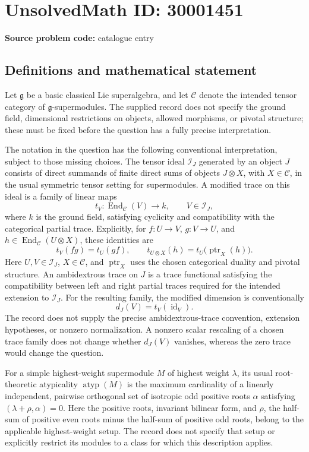 \documentclass[11pt]{article}
\begin{document}
\section*{UnsolvedMath ID: 30001451}
\textbf{Source problem code:} catalogue entry
\subsection{Definitions and mathematical statement}
Let \(\mathfrak g\) be a basic classical Lie superalgebra, and let \(\mathcal C\) denote the intended tensor category of \(\mathfrak g\)-supermodules. The supplied record does not specify the ground field, dimensional restrictions on objects, allowed morphisms, or pivotal structure; these must be fixed before the question has a fully precise interpretation.

The notation in the question has the following conventional interpretation, subject to those missing choices. The tensor ideal \(\mathcal I_J\) generated by an object \(J\) consists of direct summands of finite direct sums of objects \(J\otimes X\), with \(X\in\mathcal C\), in the usual symmetric tensor setting for supermodules. A modified trace on this ideal is a family of linear maps
\[
 t_V:\operatorname{End}_{\mathcal C}(V)\longrightarrow k,
 \qquad V\in\mathcal I_J,
\]
where \(k\) is the ground field, satisfying cyclicity and compatibility with the categorical partial trace. Explicitly, for \(f:U\to V\), \(g:V\to U\), and \(h\in\operatorname{End}_{\mathcal C}(U\otimes X)\), these identities are
\[
 t_V(fg)=t_U(gf),\qquad
 t_{U\otimes X}(h)=t_U\bigl(\operatorname{ptr}_X(h)\bigr).
\]
Here \(U,V\in\mathcal I_J\), \(X\in\mathcal C\), and \(\operatorname{ptr}_X\) uses the chosen categorical duality and pivotal structure. An ambidextrous trace on \(J\) is a trace functional satisfying the compatibility between left and right partial traces required for the intended extension to \(\mathcal I_J\). For the resulting family, the modified dimension is conventionally
\[
 d_J(V)=t_V(\operatorname{id}_V).
\]
The record does not supply the precise ambidextrous-trace convention, extension hypotheses, or nonzero normalization. A nonzero scalar rescaling of a chosen trace family does not change whether \(d_J(V)\) vanishes, whereas the zero trace would change the question.

For a simple highest-weight supermodule \(M\) of highest weight \(\lambda\), its usual root-theoretic atypicality \(\operatorname{atyp}(M)\) is the maximum cardinality of a linearly independent, pairwise orthogonal set of isotropic odd positive roots \(\alpha\) satisfying \((\lambda+\rho,\alpha)=0\). Here the positive roots, invariant bilinear form, and \(\rho\), the half-sum of positive even roots minus the half-sum of positive odd roots, belong to the applicable highest-weight setup. The record does not specify that setup or explicitly restrict its modules to a class for which this description applies.
\end{document}

